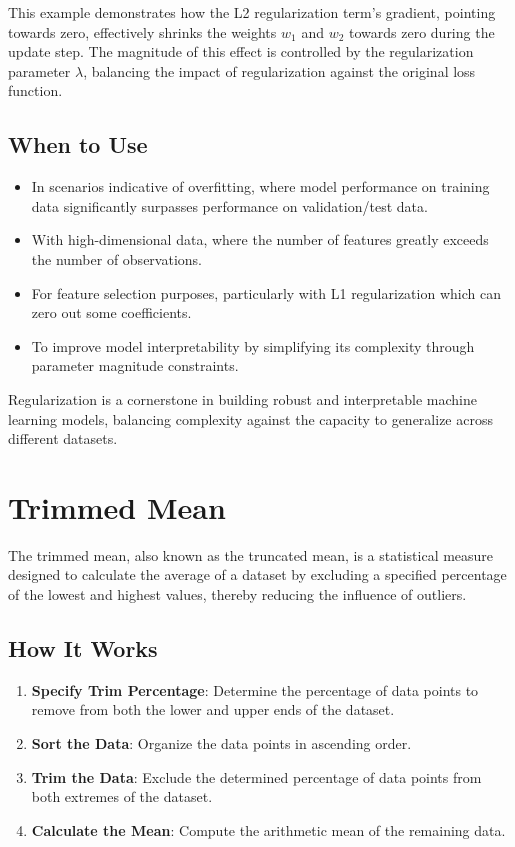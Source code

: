 \documentclass[12pt]{article}
\begin{document}
This example demonstrates how the L2 regularization term's gradient, pointing towards zero, effectively shrinks the weights \(w_1\) and \(w_2\) towards zero during the update step. The magnitude of this effect is controlled by the regularization parameter \(\lambda\), balancing the impact of regularization against the original loss function.


\subsection{When to Use}

\begin{itemize}
    \item In scenarios indicative of overfitting, where model performance on training data significantly surpasses performance on validation/test data.
    \item With high-dimensional data, where the number of features greatly exceeds the number of observations.
    \item For feature selection purposes, particularly with L1 regularization which can zero out some coefficients.
    \item To improve model interpretability by simplifying its complexity through parameter magnitude constraints.
\end{itemize}

Regularization is a cornerstone in building robust and interpretable machine learning models, balancing complexity against the capacity to generalize across different datasets.

\section{Trimmed Mean}

The trimmed mean, also known as the truncated mean, is a statistical measure designed to calculate the average of a dataset by excluding a specified percentage of the lowest and highest values, thereby reducing the influence of outliers.

\subsection{How It Works}

\begin{enumerate}
    \item \textbf{Specify Trim Percentage}: Determine the percentage of data points to remove from both the lower and upper ends of the dataset.
    \item \textbf{Sort the Data}: Organize the data points in ascending order.
    \item \textbf{Trim the Data}: Exclude the determined percentage of data points from both extremes of the dataset.
    \item \textbf{Calculate the Mean}: Compute the arithmetic mean of the remaining data.
\end{enumerate}
\end{document}
